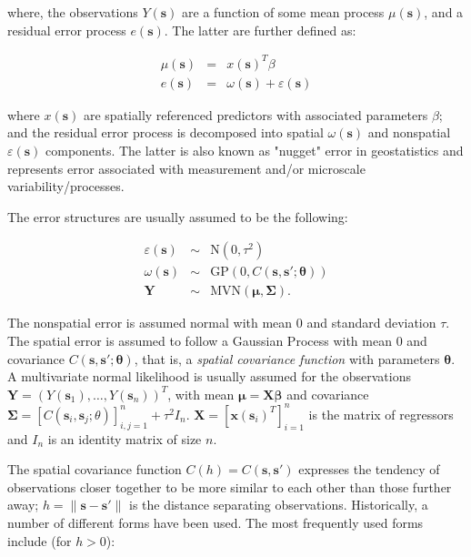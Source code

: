 \documentclass[letterpaper,portrait,11pt]{scrartcl}
\numberwithin{equation}{section}    %
\numberwithin{figure}{section}    %
\numberwithin{table}{section}       %
\begin{document}
where, the observations $Y(\bm{s})$ are a function of some mean process $\mu(\bm{s})$, and a residual error process $e(\bm{s})$. The latter are further defined as:

\begin{eqnarray*}
  \mu(\bm{s}) &=& x(\bm{s})^{T} \beta \\
  e(\bm{s})  &=& \omega(\bm{s}) + \varepsilon(\bm{s})
\end{eqnarray*}

where $x(\bm{s})$ are spatially referenced predictors with associated parameters $\beta$;  and the residual error process is decomposed into spatial $\omega(\bm{s})$ and nonspatial  $\varepsilon(\bm{s})$ components. The latter is also known as "nugget" error in geostatistics and represents error associated with measurement and/or microscale variability/processes.

The error structures are usually assumed to be the following:

\begin{eqnarray*}
  \varepsilon(\bm{s})  &\sim& \textrm{N}(0, \tau^2) \\
  \omega(\bm{s}) &\sim& \textrm{GP}(0, C(\bm{s},\bm{s}'; \bm{\theta}))  \\
  \bm{Y} &\sim& \textrm{MVN}( \bm{\mu}, \bm{\Sigma}). 
\end{eqnarray*}

The nonspatial error is assumed normal with mean 0 and standard deviation $\tau$. The spatial error is assumed to follow a Gaussian Process with mean 0 and covariance $C(\bm{s},\bm{s}'; \bm{\theta})$, that is, a \textit{spatial covariance function} with parameters $\bm{\theta}$. A multivariate normal likelihood is usually assumed for the observations $\bm{Y} = (Y(\bm{s}_1), \dots, Y(\bm{s}_n) )^T$, with mean $\bm{\mu} = \bm{X} \bm{\beta}$ and covariance $\bm{\Sigma} = \left[ C(\bm{s}_i, \bm{s}_j; \theta) \right]^{n}_{i,j=1}+ \tau^2 I_n$. $\bm{X} = \left[ \bm{x}(\bm{s}_i)^T \right]^{n}_{i=1}$ is the matrix of regressors and $I_n$ is an identity matrix of size $n$. 


The spatial covariance function $C(h) = C(\bm{s}, \bm{s}')$ expresses the tendency of observations closer together to be more similar to each other than those further away; $h=\| \bm{s} - \bm{s}' \|$ is the distance separating observations. Historically, a number of different forms have been used. The most frequently used forms include (for $h>0$):
\end{document}
